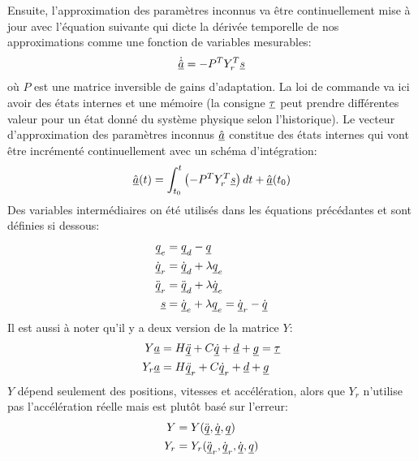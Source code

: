 Ensuite, l'approximation des paramètres inconnus va être continuellement mise à jour avec l'équation suivante qui dicte la dérivée temporelle de nos approximations comme une fonction de variables mesurables:
\begin{align}
\dot{\hat{\underline{a}}} = - P^T Y_r^T \underline{s}
\end{align}
où $P$ est une matrice inversible de gains d'adaptation. 
La loi de commande va ici avoir des états internes et une mémoire (la consigne $\underline{\tau}$ peut prendre différentes valeur pour un état donné du système physique selon l'historique). Le vecteur d'approximation des paramètres inconnus $\underline{\hat{a}}$ constitue des états internes qui vont être incrémenté continuellement avec un schéma d'intégration:
\begin{align}
\hat{\underline{a}}(t) = \int_{t_0}^{t} \left( - P^T Y_r^T \underline{s} \right) dt   + \hat{\underline{a}}(t_0)
\end{align}
Des variables intermédiaires on été utilisés dans les équations précédantes et sont définies si dessous:
\begin{align}
\underline{q}_e        &= \underline{q}_d - \underline{q} \\
\dot{\underline{q}}_r  &= \dot{\underline{q}}_d + \lambda \underline{q}_e  \\
\ddot{\underline{q}}_r &= \ddot{\underline{q}}_d + \lambda \dot{\underline{q}}_e \\
\underline{s}          &= \dot{\underline{q}}_e + \lambda \underline{q}_e = \dot{\underline{q}}_r - \dot{\underline{q}}
\end{align}
Il est aussi à noter qu'il y a deux version de la matrice $Y$:
\begin{align}
Y \underline{a}   &=  H \underline{\ddot{q}} + C \underline{\dot{q}} + \underline{d} + \underline{g}  = \underline{\tau} \\
Y_r \underline{a} &= H \underline{\ddot{q}}_r + C \underline{\dot{q}}_r + \underline{d} + \underline{g}  
\end{align}
$Y$ dépend seulement des positions, vitesses et accélération, alors que $Y_r$ n'utilise pas l'accélération réelle mais est plutôt basé sur l'erreur:
\begin{align}
Y &= Y(\ddot{\underline{q}},\dot{\underline{q}},\underline{q}) \\
Y_r &= Y_r(\ddot{\underline{q}}_r,\dot{\underline{q}}_r,\dot{\underline{q}},\underline{q})
\end{align}




